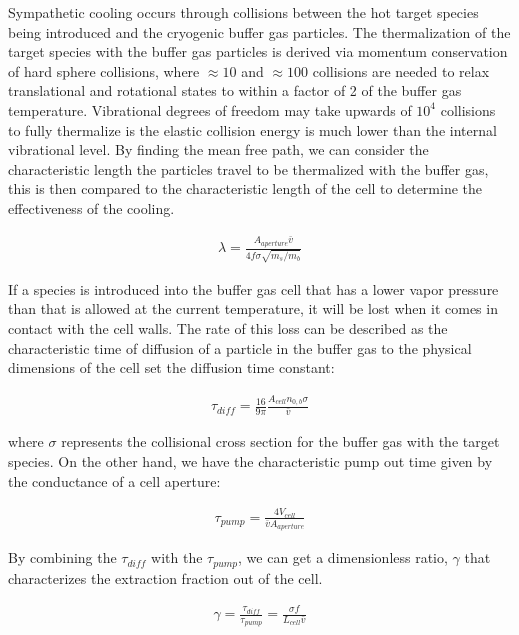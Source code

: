 \documentclass[a4paper]{article}
\begin{document}
Sympathetic cooling occurs through collisions between the hot target species being introduced and the cryogenic buffer gas particles. The thermalization of the target species with the buffer gas particles is derived via momentum conservation of hard sphere collisions, where $\approx 10$ and $\approx 100$ collisions are needed to relax translational and rotational states to within a factor of 2 of the buffer gas temperature. Vibrational degrees of freedom may take upwards of $10^4$ collisions to fully thermalize is the elastic collision energy is much lower than the internal vibrational level. By finding the mean free path, we can consider the characteristic length the particles travel to be thermalized with the buffer gas, this is then compared to the characteristic length of the cell to determine the effectiveness of the cooling.

\begin{align}
\lambda = \frac{A_{aperture} \bar{v}}{4 f \sigma \sqrt{m_s/m_b}}
\end{align}

If a species is introduced into the buffer gas cell that has a lower vapor pressure than that is allowed at the current temperature, it will be lost when it comes in contact with the cell walls. The rate of this loss can be described as the  characteristic time of diffusion of a particle in the buffer gas to the physical dimensions of the cell set the diffusion time constant:

\begin{align}
\tau_{diff} = \frac{16}{9 \pi} \frac{A_{cell} n_{0,b} \sigma}{\bar{v}}
\end{align}

where $\sigma$ represents the collisional cross section for the buffer gas with the target species. On the other hand, we have the characteristic pump out time given by the conductance of a cell aperture:

\begin{align}
\tau_{pump}=\frac{4V_{cell}}{\bar{v}A_{aperture}}
\end{align}

By combining the $\tau_{diff}$ with the $\tau_{pump}$, we can get a dimensionless ratio, $\gamma$ that characterizes the extraction fraction out of the cell.

\begin{align}
\gamma = \frac{\tau_{diff}}{\tau_{pump}} = \frac{\sigma f}{L_{cell} \bar{v}} \label{e: gamma}
\end{align}
\end{document}
